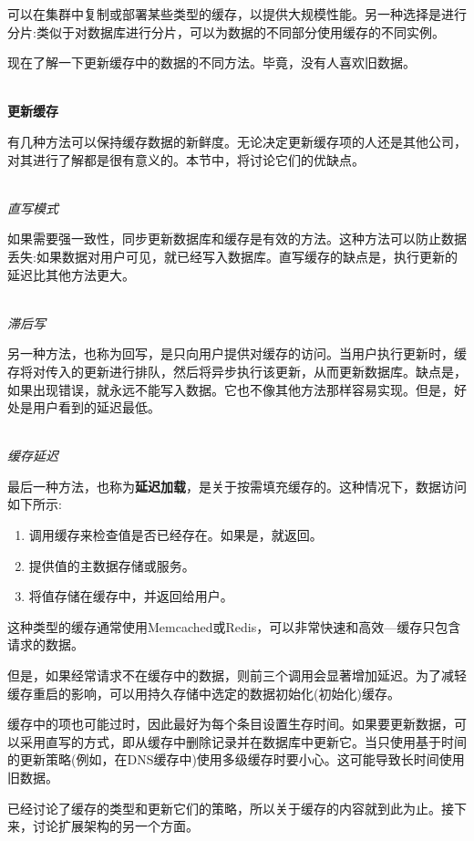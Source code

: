 可以在集群中复制或部署某些类型的缓存，以提供大规模性能。另一种选择是进行分片:类似于对数据库进行分片，可以为数据的不同部分使用缓存的不同实例。

现在了解一下更新缓存中的数据的不同方法。毕竟，没有人喜欢旧数据。

\hspace*{\fill} \\ %
\noindent
\textbf{更新缓存}

有几种方法可以保持缓存数据的新鲜度。无论决定更新缓存项的人还是其他公司，对其进行了解都是很有意义的。本节中，将讨论它们的优缺点。

\hspace*{\fill} \\ %
\noindent
\textit{直写模式}

如果需要强一致性，同步更新数据库和缓存是有效的方法。这种方法可以防止数据丢失:如果数据对用户可见，就已经写入数据库。直写缓存的缺点是，执行更新的延迟比其他方法更大。

\hspace*{\fill} \\ %
\noindent
\textit{滞后写}

另一种方法，也称为回写，是只向用户提供对缓存的访问。当用户执行更新时，缓存将对传入的更新进行排队，然后将异步执行该更新，从而更新数据库。缺点是，如果出现错误，就永远不能写入数据。它也不像其他方法那样容易实现。但是，好处是用户看到的延迟最低。

\hspace*{\fill} \\ %
\noindent
\textit{缓存延迟}

最后一种方法，也称为\textbf{延迟加载}，是关于按需填充缓存的。这种情况下，数据访问如下所示:

\begin{enumerate}
\item 
调用缓存来检查值是否已经存在。如果是，就返回。

\item 
提供值的主数据存储或服务。

\item
将值存储在缓存中，并返回给用户。
\end{enumerate}

这种类型的缓存通常使用Memcached或Redis，可以非常快速和高效—缓存只包含请求的数据。

但是，如果经常请求不在缓存中的数据，则前三个调用会显著增加延迟。为了减轻缓存重启的影响，可以用持久存储中选定的数据初始化(初始化)缓存。

缓存中的项也可能过时，因此最好为每个条目设置生存时间。如果要更新数据，可以采用直写的方式，即从缓存中删除记录并在数据库中更新它。当只使用基于时间的更新策略(例如，在DNS缓存中)使用多级缓存时要小心。这可能导致长时间使用旧数据。

已经讨论了缓存的类型和更新它们的策略，所以关于缓存的内容就到此为止。接下来，讨论扩展架构的另一个方面。






